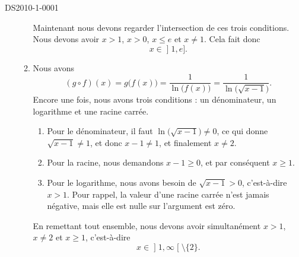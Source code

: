 \begin{corrige}{DS2010-1-0001}
\begin{enumerate}
\begin{enumerate}
\begin{enumerate}
					\end{enumerate}
					Maintenant nous devons regarder l'intersection de ces trois conditions. Nous devons avoir $x>1$, $x>0$, $x\leq e$ et $x\neq 1$. Cela fait donc
					\begin{equation}
						x\in\mathopen] 1 , e \mathclose].
					\end{equation}
				\item
					Nous avons
					\begin{equation}
						(g\circ f)(x)=g\big( f(x) \big)=\frac{1}{ \ln\big( f(x) \big) }=\frac{1}{ \ln\big( \sqrt{x-1} \big) }.
					\end{equation}
					Encore une fois, nous avons trois conditions : un dénominateur, un logarithme et une racine carrée.
					\begin{enumerate}
						\item
							Pour le dénominateur, il faut $\ln\big( \sqrt{x-1} \big)\neq 0$, ce qui donne $\sqrt{x-1}\neq 1$, et donc $x-1\neq 1$, et finalement $x\neq 2$.
						\item
							Pour la racine, nous demandons $x-1\geq 0$, et par conséquent $x\geq 1$.
						\item
							Pour le logarithme, nous avons besoin de $\sqrt{x-1}>0$, c'est-à-dire $x> 1$. Pour rappel, la valeur d'une racine carrée n'est jamais négative, mais elle est nulle sur l'argument est zéro.
					\end{enumerate}
					En remettant tout ensemble, nous devons avoir simultanément $x> 1$, $x\neq 2$ et $x\geq 1$, c'est-à-dire
					\begin{equation}
						x\in\mathopen] 1 , \infty \mathclose[\setminus\{ 2 \}.
					\end{equation}
					
			\end{enumerate}
	\end{enumerate}

\end{corrige}
